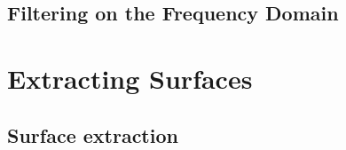 \subsection{Filtering on the Frequency Domain}
\label{FFTImageFilterFourierDomainFiltering}



\section{Extracting Surfaces}
\label{sec:ExtractingSurfaces}

\subsection{Surface extraction}
\label{sec:SufaceExtraction}


